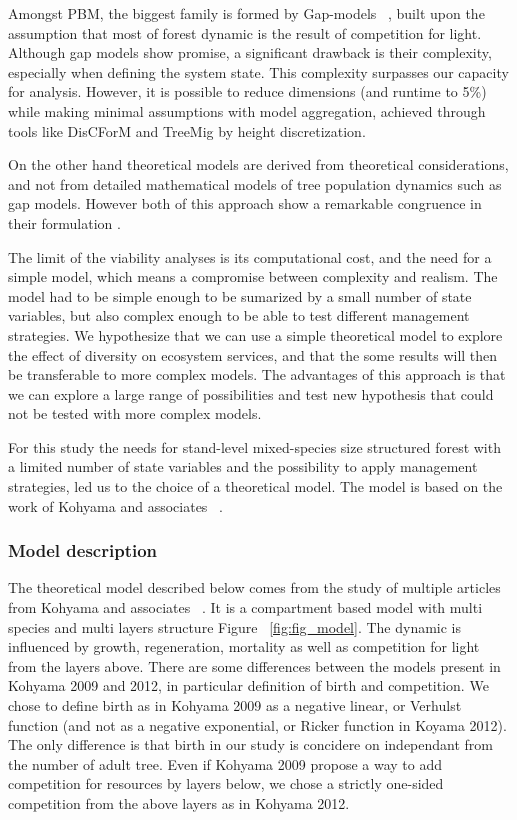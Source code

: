 \documentclass{article}
\begin{document}
Amongst PBM, the biggest family is formed by Gap-models ~\autocite{bugmannREVIEWFORESTGAP2001}, built upon the assumption that most of forest dynamic is the result of competition for light.
Although gap models show promise, a significant drawback is their complexity, especially when defining the system state. This complexity surpasses our capacity for analysis. However, it is possible to reduce dimensions (and runtime to 5\%) while making minimal assumptions with model aggregation, achieved through tools like DisCForM and TreeMig \autocite{lischkeAggregationIndividualTrees1998,lischkeTreeMigForestlandscapeModel2006} by height discretization.

On the other hand theoretical models are derived from theoretical considerations, and not from detailed mathematical models of tree population dynamics such as gap models. However both of this approach show a remarkable congruence in their formulation \autocite{bugmannREVIEWFORESTGAP2001}.

The limit of the viability analyses is its computational cost, and the need for a simple model, which means a compromise between complexity and realism. The model had to be simple enough to be sumarized by a small number of state variables, but also complex enough to be able to test different management strategies. We hypothesize that we can use a simple theoretical model to explore the effect of diversity on ecosystem services, and that the some results will then be transferable to more complex models. The advantages of this approach is that we can explore a large range of possibilities and test new hypothesis that could not be tested with more complex models.

For this study the needs for stand-level mixed-species size structured forest with a limited number of state variables and the possibility to apply management strategies, led us to the choice of a theoretical model. The model is based on the work of Kohyama and associates ~\autocite{kohyamaStratificationTheoryPlant2009, kohyamaOnesidedCompetitionLight2012}.

\subsubsection{Model description}

The theoretical model described below comes from the study of multiple articles from Kohyama and associates ~\autocite{kohyamaStratificationTheoryPlant2009, kohyamaOnesidedCompetitionLight2012}.
It is a compartment based model with multi species and multi layers structure Figure ~\ref{fig:fig_model}. The dynamic is influenced by growth, regeneration, mortality as well as competition for light from the layers above. There are some differences between the models present in Kohyama 2009 and 2012, in particular definition of birth and competition. We chose to define birth as in Kohyama 2009 as a negative linear, or Verhulst function (and not as a negative exponential, or Ricker function in Koyama 2012). The only difference is that birth in our study is concidere on independant from the number of adult tree. Even if Kohyama 2009 propose a way to add competition for resources by layers below, we chose a strictly one-sided competition from the above layers as in Kohyama 2012.
\end{document}
